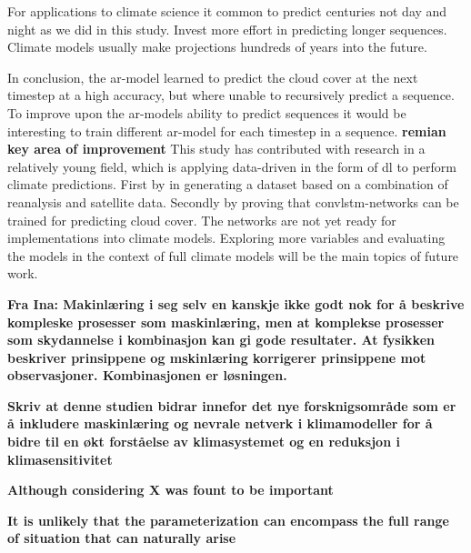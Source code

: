 For applications to climate science it common to predict centuries not day and night as we did in this study. Invest more effort in predicting longer sequences. Climate models usually make projections hundreds of years into the future.

In conclusion, the \acrshort{ar}-model learned to predict the cloud cover at the next timestep at a high accuracy, but where unable to recursively predict a sequence. To improve upon the \acrshort{ar}-models ability to predict sequences it would be interesting to train different \acrshort{ar}-model for each timestep in a sequence. 
\textbf{remian key area of improvement}
This study has contributed with research in a relatively young field, which is applying data-driven in the form of \acrshort{dl} to perform climate predictions. First by in generating a dataset based on a combination of reanalysis and satellite data. Secondly by proving that \acrshort{convlstm}-networks can be trained for predicting cloud cover. The networks are not yet ready for implementations into climate models. Exploring more variables and evaluating the models in the context of full climate models will be the main topics of future work. 


\textbf{Fra Ina: Makinlæring i seg selv en kanskje ikke godt nok for å beskrive kompleske prosesser som maskinlæring, men at komplekse prosesser som skydannelse i kombinasjon kan gi gode resultater. At fysikken beskriver prinsippene og mskinlæring korrigerer prinsippene mot observasjoner. Kombinasjonen er løsningen.}

\textbf{Skriv at denne studien bidrar innefor det nye forsknigsområde som er å inkludere maskinlæring og nevrale netverk i klimamodeller for å bidre til en økt forståelse av klimasystemet og en reduksjon i klimasensitivitet}

\textbf{Although considering X was fount to be important}

\textbf{It is unlikely that the parameterization can encompass the full range of situation that can naturally arise}


